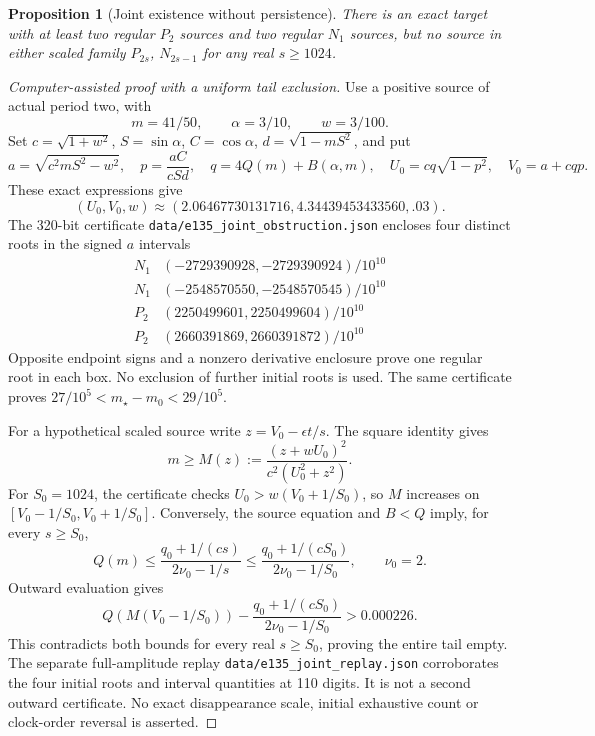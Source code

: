 \documentclass[11pt,a4paper]{article}
\newtheorem{proposition}[theorem]{Proposition}
\theoremstyle{remark}\newtheorem{remark}[theorem]{Remark}
\begin{document}
\begin{proposition}[Joint existence without persistence]
\label{prop:dilation-obstruction}
There is an exact target with at least two regular $P_2$ sources and two
regular $N_1$ sources, but no source in either scaled family $P_{2s}$,
$N_{2s-1}$ for any real $s\ge1024$.
\end{proposition}
\begin{proof}[Computer-assisted proof with a uniform tail exclusion]
Use a positive source of actual period two, with
\[
 m=41/50,\qquad \alpha=3/10,\qquad w=3/100.
\]
Set $c=\sqrt{1+w^2}$, $S=\sin\alpha$, $C=\cos\alpha$,
$d=\sqrt{1-mS^2}$, and put
\[
 a=\sqrt{c^2mS^2-w^2},\quad p=\frac{aC}{cSd},\quad
 q=4Q(m)+B(\alpha,m),\quad
 U_0=cq\sqrt{1-p^2},\quad V_0=a+cqp.
\]
These exact expressions give
\[
 (U_0,V_0,w)\approx(2.06467730131716,4.34439453433560,.03).
\]
The 320-bit certificate \nolinkurl{data/e135_joint_obstruction.json}
encloses four distinct roots in the signed $a$ intervals
\[
\begin{array}{c|r}
 N_1&(-2729390928,-2729390924)/10^{10}\\
 N_1&(-2548570550,-2548570545)/10^{10}\\
 P_2&(2250499601,2250499604)/10^{10}\\
 P_2&(2660391869,2660391872)/10^{10}
\end{array}
\]
Opposite endpoint signs and a nonzero derivative enclosure prove one
regular root in each box. No exclusion of further initial roots is used.
The same certificate proves
$27/10^5<m_\star-m_0<29/10^5$.

For a hypothetical scaled source write $z=V_0-\epsilon t/s$.
The square identity gives
\[
 m\ge M(z):=\frac{(z+wU_0)^2}{c^2(U_0^2+z^2)}.
\]
For $S_0=1024$, the certificate checks $U_0>w(V_0+1/S_0)$, so
$M$ increases on $[V_0-1/S_0,V_0+1/S_0]$. Conversely, the source
equation and $B<Q$ imply, for every $s\ge S_0$,
\[
 Q(m)\le\frac{q_0+1/(cs)}{2\nu_0-1/s}
 \le\frac{q_0+1/(cS_0)}{2\nu_0-1/S_0},\qquad \nu_0=2.
\]
Outward evaluation gives
\[
 Q(M(V_0-1/S_0))-
 \frac{q_0+1/(cS_0)}{2\nu_0-1/S_0}>0.000226.
\]
This contradicts both bounds for every real $s\ge S_0$, proving the
entire tail empty. The separate full-amplitude replay
\nolinkurl{data/e135_joint_replay.json} corroborates the four initial
roots and interval quantities at 110 digits. It is not a second outward
certificate. No exact disappearance scale, initial exhaustive count or
clock-order reversal is asserted.
\end{proof}
\end{document}
